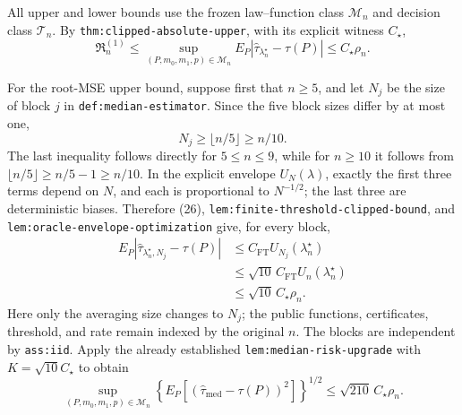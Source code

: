 All upper and lower bounds use the frozen law--function class
\(\mathcal M_n\) and decision class \(\mathcal T_n\).  By
\texttt{thm:clipped-absolute-upper}, with its explicit witness
\(C_\star\),
\[
\mathfrak R_n^{(1)}
\leq\sup_{(P,m_0,m_1,p)\in\mathcal M_n}
E_P|\widehat\tau_{\lambda_n^\star}-\tau(P)|
\leq C_\star\rho_n.                                               \tag{25}
\]

For the root-MSE upper bound, suppose first that \(n\geq5\), and let \(N_j\)
be the size of block \(j\) in \texttt{def:median-estimator}.  Since the five
block sizes differ by at most one,
\[
N_j\geq\lfloor n/5\rfloor\geq n/10.                               \tag{26}
\]
The last inequality follows directly for \(5\leq n\leq9\), while for
\(n\geq10\) it follows from
\(\lfloor n/5\rfloor\geq n/5-1\geq n/10\).  In the explicit envelope
\(U_N(\lambda)\), exactly the first three terms depend on \(N\), and each is
proportional to \(N^{-1/2}\); the last three are deterministic biases.
Therefore (26), \texttt{lem:finite-threshold-clipped-bound}, and \texttt{lem:oracle-envelope-optimization} give, for every block,
\[
\begin{split}
E_P|\widehat\tau_{\lambda_n^\star,N_j}-\tau(P)|
&\leq C_{\mathrm{FT}}U_{N_j}(\lambda_n^\star)\\
&\leq\sqrt{10}\,C_{\mathrm{FT}}U_n(\lambda_n^\star)\\
&\leq\sqrt{10}\,C_\star\rho_n.
\end{split} \tag{27}
\]
Here only the averaging size changes to \(N_j\); the public functions,
certificates, threshold, and rate remain indexed by the original \(n\).
The blocks are independent by \texttt{ass:iid}.  Apply the already established
\texttt{lem:median-risk-upgrade} with
\(K=\sqrt{10}C_\star\) to obtain
\[
\sup_{(P,m_0,m_1,p)\in\mathcal M_n}
\left\{E_P[(\widehat\tau_{\mathrm{med}}-\tau(P))^2]\right\}^{1/2}
\leq\sqrt{210}\,C_\star\rho_n.                                   \tag{28}
\]

